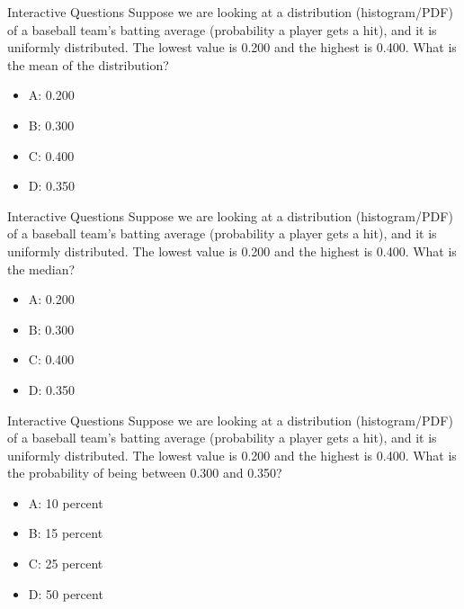 \documentclass{beamer}
\begin{document}
\begin{frame}{Interactive Questions}
Suppose we are looking at a distribution (histogram/PDF) of a baseball team's batting average (probability a player gets a hit), and it is uniformly distributed.  The lowest value is 0.200 and the highest is 0.400.  What is the mean of the distribution?
\begin{itemize}
\item A: 0.200
\item B: 0.300
\item C: 0.400
\item D: 0.350
\end{itemize}
\end{frame}

\begin{frame}{Interactive Questions}
Suppose we are looking at a distribution (histogram/PDF) of a baseball team's batting average (probability a player gets a hit), and it is uniformly distributed.  The lowest value is 0.200 and the highest is 0.400.  What is the median?
\begin{itemize}
\item A: 0.200
\item B: 0.300
\item C: 0.400
\item D: 0.350
\end{itemize}
\end{frame}

\begin{frame}{Interactive Questions}
Suppose we are looking at a distribution (histogram/PDF) of a baseball team's batting average (probability a player gets a hit), and it is uniformly distributed.  The lowest value is 0.200 and the highest is 0.400.  What is the probability of being between 0.300 and 0.350?
\begin{itemize}
\item A: 10 percent
\item B: 15 percent
\item C: 25 percent
\item D: 50 percent
\end{itemize}
\end{frame}
\end{document}
